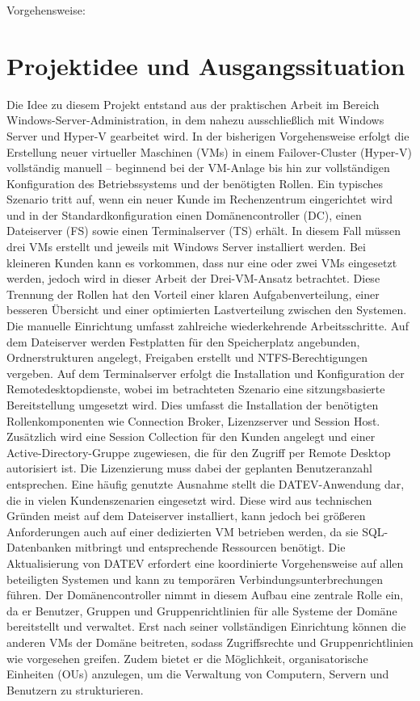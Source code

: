 \documentclass[conference]{IEEEtran}
\begin{document}
Vorgehensweise:


\section{Projektidee und Ausgangssituation}

Die Idee zu diesem Projekt entstand aus der praktischen Arbeit im Bereich Windows-Server-Administration, in dem nahezu ausschließlich mit Windows Server und Hyper-V gearbeitet wird.
In der bisherigen Vorgehensweise erfolgt die Erstellung neuer virtueller Maschinen (VMs) in einem Failover-Cluster (Hyper-V) vollständig manuell – beginnend bei der VM-Anlage bis hin zur vollständigen Konfiguration des Betriebssystems und der benötigten Rollen.
Ein typisches Szenario tritt auf, wenn ein neuer Kunde im Rechenzentrum eingerichtet wird und in der Standardkonfiguration einen Domänencontroller (DC), einen Dateiserver (FS) sowie einen Terminalserver (TS) erhält.
In diesem Fall müssen drei VMs erstellt und jeweils mit Windows Server installiert werden.
Bei kleineren Kunden kann es vorkommen, dass nur eine oder zwei VMs eingesetzt werden, jedoch wird in dieser Arbeit der Drei-VM-Ansatz betrachtet.
Diese Trennung der Rollen hat den Vorteil einer klaren Aufgabenverteilung, einer besseren Übersicht und einer optimierten Lastverteilung zwischen den Systemen.
Die manuelle Einrichtung umfasst zahlreiche wiederkehrende Arbeitsschritte.
Auf dem Dateiserver werden Festplatten für den Speicherplatz angebunden, Ordnerstrukturen angelegt, Freigaben erstellt und NTFS-Berechtigungen vergeben.
Auf dem Terminalserver erfolgt die Installation und Konfiguration der Remotedesktopdienste, wobei im betrachteten Szenario eine sitzungsbasierte Bereitstellung umgesetzt wird.
Dies umfasst die Installation der benötigten Rollenkomponenten wie Connection Broker, Lizenzserver und Session Host.
Zusätzlich wird eine Session Collection für den Kunden angelegt und einer Active-Directory-Gruppe zugewiesen, die für den Zugriff per Remote Desktop autorisiert ist.
Die Lizenzierung muss dabei der geplanten Benutzeranzahl entsprechen.
Eine häufig genutzte Ausnahme stellt die DATEV-Anwendung dar, die in vielen Kundenszenarien eingesetzt wird.
Diese wird aus technischen Gründen meist auf dem Dateiserver installiert, kann jedoch bei größeren Anforderungen auch auf einer dedizierten VM betrieben werden, da sie SQL-Datenbanken mitbringt und entsprechende Ressourcen benötigt.
Die Aktualisierung von DATEV erfordert eine koordinierte Vorgehensweise auf allen beteiligten Systemen und kann zu temporären Verbindungsunterbrechungen führen.
Der Domänencontroller nimmt in diesem Aufbau eine zentrale Rolle ein, da er Benutzer, Gruppen und Gruppenrichtlinien für alle Systeme der Domäne bereitstellt und verwaltet.
Erst nach seiner vollständigen Einrichtung können die anderen VMs der Domäne beitreten, sodass Zugriffsrechte und Gruppenrichtlinien wie vorgesehen greifen.
Zudem bietet er die Möglichkeit, organisatorische Einheiten (OUs) anzulegen, um die Verwaltung von Computern, Servern und Benutzern zu strukturieren.
\end{document}

